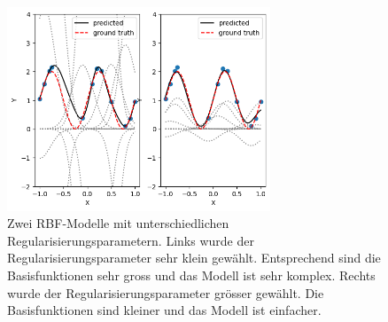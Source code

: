 \begin{figure}[tb]
    \center
    \includegraphics[width=0.7\textwidth]{Figures/ML-regularization.png}
    \caption{Zwei RBF-Modelle mit unterschiedlichen Regularisierungsparametern. 
    Links wurde der Regularisierungsparameter sehr klein gewählt. Entsprechend 
    sind die Basisfunktionen sehr gross und das Modell ist sehr komplex. Rechts
    wurde der Regularisierungsparameter grösser gewählt. Die Basisfunktionen sind
    kleiner und das Modell ist einfacher.}
    \label{fig:ml-regularisierung}    
\end{figure}


